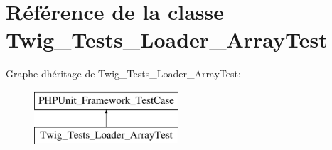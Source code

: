 \hypertarget{class_twig___tests___loader___array_test}{}\section{Référence de la classe Twig\+\_\+\+Tests\+\_\+\+Loader\+\_\+\+Array\+Test}
\label{class_twig___tests___loader___array_test}
Graphe d\textquotesingle{}héritage de Twig\+\_\+\+Tests\+\_\+\+Loader\+\_\+\+Array\+Test\+:\begin{figure}[H]
\begin{center}
\leavevmode
\includegraphics[height=2.000000cm]{class_twig___tests___loader___array_test}
\end{center}
\end{figure}

